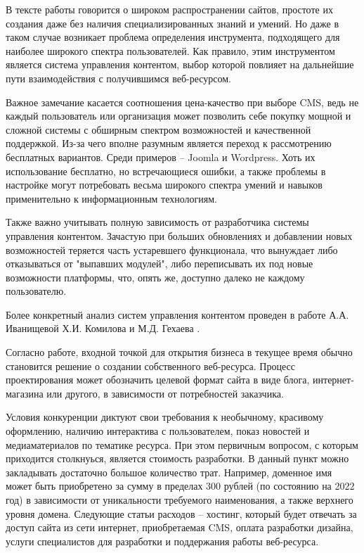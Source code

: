 В тексте работы говорится о широком распространении сайтов, простоте их создания даже без наличия специализированных знаний и умений.
Но даже в таком случае возникает проблема определения инструмента, подходящего для наиболее широкого спектра пользователей.
Как правило, этим инструментом является система управления контентом, выбор которой повлияет на дальнейшие пути взаимодействия с получившимся веб-ресурсом.

Важное замечание касается соотношения цена-качество при выборе CMS, ведь не каждый пользователь или организация может позволить себе покупку мощной и сложной системы с обширным спектром возможностей и качественной поддержкой.
Из-за чего вполне разумным является переход к рассмотрению бесплатных вариантов.
Среди примеров -- Joomla и Wordpress.
Хоть их использование бесплатно, но встречающиеся ошибки, а также проблемы в настройке могут потребовать весьма широкого спектра умений и навыков применительно к информационным технологиям.

Также важно учитывать полную зависимость от разработчика системы управления контентом.
Зачастую при больших обновлениях и добавлении новых возможностей теряется часть устаревшего функционала, что вынуждает либо отказываться от "выпавших модулей", либо переписывать их под новые возможности платформы, что, опять же, доступно далеко не каждому пользователю.

Более конкретный анализ систем управления контентом проведен в работе А.А. Иванищевой Х.И. Комилова и М.Д. Гехаева \cite{ivanisheva-cms}.

Согласно работе, входной точкой для открытия бизнеса в текущее время обычно становится решение о создании собственного веб-ресурса.
Процесс проектирования может обозначить целевой формат сайта в виде блога, интернет-магазина или другого, в зависимости от потребностей заказчика.

Условия конкуренции диктуют свои требования к необычному, красивому оформлению, наличию интерактива с пользователем, показ новостей и медиаматериалов по тематике ресурса.
При этом первичным вопросом, с которым приходится столкнуься, является стоимость разработки.
В данный пункт можно закладывать достаточно большое количество трат.
Например, доменное имя может быть приобретено за сумму в пределах 300 рублей (по состоянию на 2022 год) в зависимости от уникальности требуемого наименования, а также верхнего уровня домена.
Следующие статьи расходов -- хостинг, который будет отвечать за доступ сайта из сети интернет, приобретаемая CMS, оплата разработки дизайна, услуги специалистов для разработки и поддержания работы веб-ресурса.

